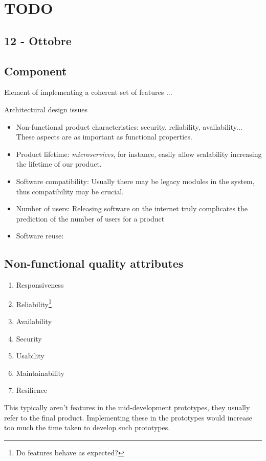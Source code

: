 \chapter{TODO}
\section*{12 - Ottobre}
\section{Component}
Element of implementing a coherent set of features
...

Architectural design issues
\begin{itemize}
    \item Non-functional product characteristics: security, reliability, availability...
    These aspects are as important as functional properties.
    \item Product lifetime: 
    \textit{microservices}, for instance, easily allow scalability increasing the lifetime of our product.
    \item Software compatibility:
    Usually there may be legacy modules in the system,
    thus compatibility may be crucial.
    \item Number of users:
    Releasing software on the internet truly complicates the prediction of the number of users for a product 
    \item Software reuse: 
\end{itemize}

\section{Non-functional quality attributes}
\begin{enumerate}
    \item Responsiveness
    \item Reliability\footnote{Do features behave as expected?}
    \item Availability
    \item Security
    \item Usability
    \item Maintainability
    \item Resilience
\end{enumerate}
This typically aren't features in the mid-development prototypes,
they usually refer to the final product.
Implementing these in the prototypes would increase too much the time taken to develop such prototypes.
\nl

